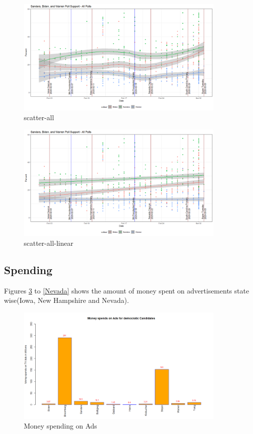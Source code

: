\begin{figure}[H]
    \centering
    \includegraphics[width=0.9\textwidth]{figures/scatter-all.png}
    \caption{scatter-all}
    \label{scatter-all}
\end{figure}

\begin{figure}[H]
    \centering
    \includegraphics[width=0.9\textwidth]{figures/scatter-all-linear.png}
    \caption{scatter-all-linear}
    \label{scatter-all-linear}
\end{figure}

\subsection{Spending}

Figures \ref{MoneyspendinAds} to \ref{Nevada} shows the amount of money spent on advertisements state wise(Iowa, New Hampshire and Nevada).

\begin{figure}[H]
    \centering
    \includegraphics[width=0.9\textwidth]{figures/MoneyspendinAds.png}
    \caption{Money spending on Ads}
    \label{MoneyspendinAds}
\end{figure}

